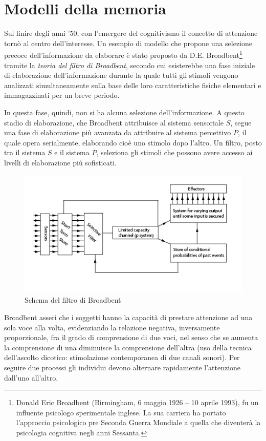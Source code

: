 \section{Modelli della memoria}
Sul finire degli anni '50, con l'emergere del cognitivismo il concetto di attenzione tornò al centro dell’interesse. Un esempio di modello che propone una selezione precoce dell’informazione da elaborare è stato proposto da D.E. Broadbent\footnote{Donald Eric Broadbent (Birmingham, 6 maggio 1926 – 10 aprile 1993), fu un influente psicologo sperimentale inglese. La sua carriera ha portato l'approccio psicologico pre Seconda Guerra Mondiale a quella che diventerà la psicologia cognitiva negli anni Sessanta.} tramite la \emph{teoria del filtro di Broadbent}, secondo cui esisterebbe una fase iniziale di elaborazione dell’informazione durante la quale tutti gli stimoli vengono analizzati simultaneamente sulla base delle loro caratteristiche fisiche elementari e immagazzinati per un breve periodo.

In questa fase, quindi, non si ha alcuna selezione dell’informazione. A questo stadio di elaborazione, che Broadbent attribuisce al sistema sensoriale $S$, segue una fase di elaborazione più avanzata da attribuire al sistema percettivo $P$, il quale opera serialmente, elaborando cioè uno stimolo dopo l’altro. Un filtro, posto tra il sistema $S$ e il sistema $P$, seleziona gli stimoli che possono avere accesso ai livelli di elaborazione più sofisticati.

\begin{figure}[hbt]
  \centering
  \includegraphics[width=\textwidth]{img/filtro-broadbent.jpg}
  \caption{Schema del filtro di Broadbent}
  \label{fig:broadbent}
\end{figure}

Broadbent asserì che i soggetti hanno la capacità di prestare attenzione ad una sola voce alla volta, evidenziando la relazione negativa, inversamente proporzionale, fra il grado di comprensione di due voci, nel senso che se aumenta la comprensione di una diminuisce la comprensione dell'altra (uso della tecnica dell'ascolto dicotico: stimolazione contemporanea di due canali sonori). Per seguire due processi gli individui devono alternare rapidamente l’attenzione dall’uno all’altro.

